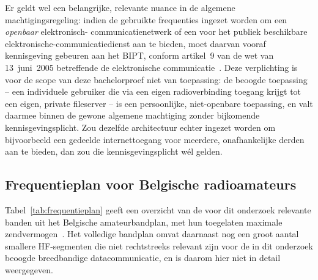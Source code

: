 Er geldt wel een belangrijke, relevante nuance in de algemene machtigingsregeling: indien
de gebruikte frequenties ingezet worden om een \emph{openbaar} elektronisch-
communicatienetwerk of een voor het publiek beschikbare elektronische-communicatiedienst
aan te bieden, moet daarvan vooraf kennisgeving gebeuren aan het BIPT, conform artikel~9
van de wet van 13~juni~2005 betreffende de elektronische communicatie~\autocite{BIPT2019}.
Deze verplichting is voor de scope van deze bachelorproef niet van toepassing: de
beoogde toepassing -- een individuele gebruiker die via een eigen radioverbinding
toegang krijgt tot een eigen, private fileserver -- is een persoonlijke, niet-openbare
toepassing, en valt daarmee binnen de gewone algemene machtiging zonder bijkomende
kennisgevingsplicht. Zou dezelfde architectuur echter ingezet worden om bijvoorbeeld een
gedeelde internettoegang voor meerdere, onafhankelijke derden aan te bieden, dan zou die
kennisgevingsplicht wél gelden.

\subsection{Frequentieplan voor Belgische radioamateurs}%
\label{subsec:frequentieplan}

Tabel~\ref{tab:frequentieplan} geeft een overzicht van de voor dit onderzoek relevante
banden uit het Belgische amateurbandplan, met hun toegelaten maximale
zendvermogen~\autocite{BIPT2019, UBAFrequenties}. Het volledige bandplan omvat
daarnaast nog een groot aantal smallere HF-segmenten die niet rechtstreeks relevant
zijn voor de in dit onderzoek beoogde breedbandige datacommunicatie, en is daarom hier
niet in detail weergegeven.

